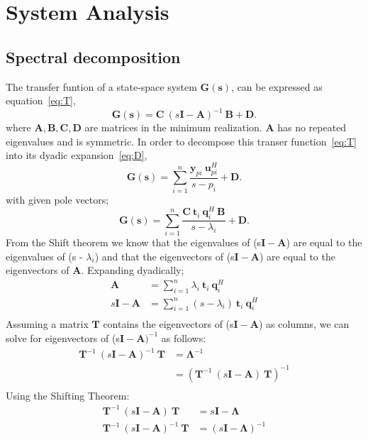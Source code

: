 \documentclass{scrreprt}
\begin{document}
\chapter{System Analysis}

\section{Spectral decomposition}
The transfer funtion of a state-space system $\mathbf{G(s)}$, can be expressed as equation~\eqref{eq:T},
\begin{equation}
 \bm{G(s)} = \bm{C} \: (s\bm{I} - \bm{A})^{-1} \: \bm{B} + \bm{D} \text{.}
  \label{eq:T}
\end{equation}
where $\bm{A}, \bm{B}, \bm{C}, \bm{D}$  are matrices in the minimum realization. $\bm{A}$  has no repeated eigenvalues and is symmetric. In order to decompose this transer function~\eqref{eq:T} into its dyadic expansion~\eqref{eq:D},
\begin{equation}
 \bm{G(s)} = \sum_{i=1}^n \frac{\bm{y}_{pi}\: \bm{u}_{pi}^H}{s - p_i} + \bm{D} \text{.}
  \label{eq:D}
\end{equation}
with given pole vectors;
\begin{equation}
 \bm{G(s)} = \sum_{i=1}^n \frac{\bm{C}\: \bm{t}_i\: \bm{q}_i^H\: \bm{B}}{s - \lambda_i} + \bm{D} \text{.}
  \label{eq:D1}
\end{equation}
From the Shift theorem we know that the eigenvalues of (s$\bm{I} - \bm{A}$) are equal to the eigenvalues of (s - $\lambda_i$)
and that the eigenvectors of  (s$\bm{I} - \bm{A}$) are equal to the eigenvectors of $\bm{A}$.
Expanding dyadically; 
\begin{align*}
\bm{A} &= \sum_{i=1}^n \lambda_i \: \bm{t}_i\: \bm{q}_i^H \\
s\bm{I} - \bm{A} &= \sum_{i=1}^n (s - \lambda_i) \: \bm{t}_i\: \bm{q}_i^H \\
\end{align*}
Assuming a matrix $\bm{T}$ contains the eigenvectors of (s$\bm{I} - \bm{A}$) as columns, we can solve for eigenvectors of (s$\bm{I} - \bm{A})^{-1}$ as follows:
\begin{align*}
\bm{T}^{-1}\: (s\bm{I} - \bm{A})^{-1}\: \bm{T} &= \bm{\Lambda}^{-1} \\
	&= (\bm{T}^{-1}\: (s\bm{I} - \bm{A})\: \bm{T})^{-1} \\
\end{align*}
Using the Shifting Theorem:
\begin{align*}
\bm{T}^{-1}\: (s\bm{I} - \bm{A})\: \bm{T} &=  s\bm{I} - \bm{\Lambda} \\
\bm{T}^{-1}\: (s\bm{I} - \bm{A})^{-1}\: \bm{T} &= (s\bm{I} - \bm{\Lambda})^{-1} \\
\end{align*}
\end{document}
